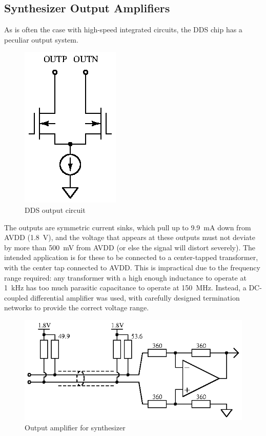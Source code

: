 \subsection{Synthesizer Output Amplifiers}

As is often the case with high-speed integrated circuits, the DDS chip has a
peculiar output system.

\begin{figure}[H]
\centering
\includegraphics{dds-output}
\caption{DDS output circuit}
\label{fig:ddsoutput}
\end{figure}

The outputs are symmetric current sinks, which pull up to 9.9~mA
down from AVDD (1.8~V), and the voltage that appears at these
outputs must not deviate by more than 500~mV from AVDD (or else
the signal will distort severely). The intended application is for these
to be connected to a center-tapped transformer, with the center tap connected
to AVDD. This is impractical due to the frequency range required: any
transformer with a high enough inductance to operate at 1~kHz has
too much parasitic capacitance to operate at 150~MHz. Instead,
a DC-coupled differential amplifier was used, with carefully designed
termination networks to provide the correct voltage range.

\begin{figure}[H]
\centering
\includegraphics{dds-outamp}
\caption{Output amplifier for synthesizer}
\label{fig:synthoutput}
\end{figure}

